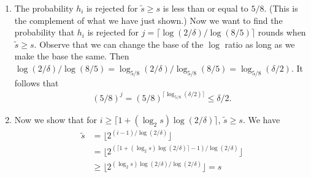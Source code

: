 \begin{enumerate}
\begin{enumerate}
        \item
        The probability
        $h_i$ is rejected for $\tilde{s}\geq s$ is
        less than or equal to $5/8$.
        (This is the complement of what we have just shown.)
        Now we want to find the probability that
        $h_i$ is rejected for 
        $j=\lceil \log(2/\delta)/\log(8/5)\rceil$
        rounds when $\tilde{s}\geq s$.
        Observe that we can change the base
        of the $\log$ ratio as long as we make the
        base the same.
        Then
        $\log(2/\delta)/\log(8/5)=\log_{5/8}(2/\delta)/
        \log_{5/8}(8/5) = \log_{5/8}(\delta/2)$.
        It follows that
        \begin{align}
            (5/8)^j = (5/8)^{\lceil \log_{5/8}(\delta/2)\rceil}
            \leq \delta/2.
            \nonumber
        \end{align}

        \item
        Now we show that for
        $i \geq \lceil 1+(\log_2 s) \log(2/\delta) \rceil$,
        $\tilde{s}\geq s$.
        We have
        \begin{align}
            \tilde{s}&= \lfloor 2^{(i-1)/\log(2/\delta)} \rfloor
            \nonumber \\
            &= \lfloor 2^{(\lceil 1+(\log_2 s) \log(2/\delta) \rceil-1)/\log(2/\delta)} \rfloor
            \nonumber \\
            &\geq \lfloor 2^{(\log_2 s) \log(2/\delta)/\log(2/\delta)} \rfloor
            = s
            \nonumber
        \end{align}


\end{enumerate}
\end{enumerate}
